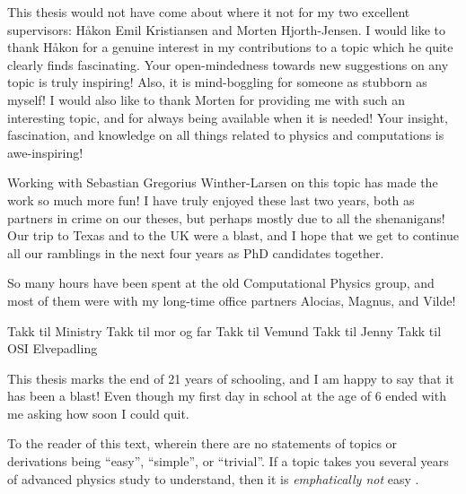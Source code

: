 This thesis would not have come about where it not for my two excellent
supervisors: Håkon Emil Kristiansen and Morten Hjorth-Jensen.
I would like to thank Håkon for a genuine interest in my contributions to a
topic which he quite clearly finds fascinating.
Your open-mindedness towards new suggestions on any topic is truly inspiring!
Also, it is mind-boggling for someone as stubborn as myself!
I would also like to thank Morten for providing me with such an interesting topic,
and for always being available when it is needed!
Your insight, fascination, and knowledge on all things related to physics and
computations is awe-inspiring!

Working with Sebastian Gregorius Winther-Larsen on this topic has made the work
so much more fun!
I have truly enjoyed these last two years, both as partners in crime on our
theses, but perhaps mostly due to all the shenanigans!
Our trip to Texas and to the UK were a blast, and I hope that we get to continue
all our ramblings in the next four years as PhD candidates together.

So many hours have been spent at the old Computational Physics group, and most
of them were with my long-time office partners Alocias, Magnus, and Vilde!

Takk til Ministry
Takk til mor og far
Takk til Vemund
Takk til Jenny
Takk til OSI Elvepadling

This thesis marks the end of 21 years of schooling, and I am happy to say that
it has been a blast!
Even though my first day in school at the age of 6 ended with me asking how soon
I could quit.

To the reader of this text, wherein there are no statements of topics or
derivations being ``easy'', ``simple'', or ``trivial''.
If a topic takes you several years of advanced physics study to understand, then
it is \emph{emphatically not} easy \cite{nontrivial-manifesto}.
